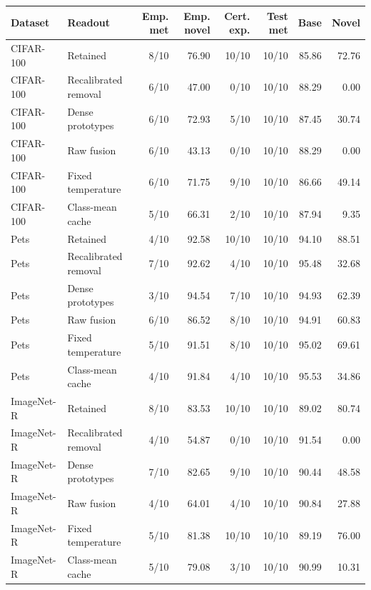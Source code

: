 \begin{tabular}{llrrrrrr}
\toprule
Dataset & Readout & Emp. met & Emp. novel & Cert. exp. & Test met & Base & Novel \\
\midrule
CIFAR-100 & Retained & 8/10 & 76.90 & 10/10 & 10/10 & 85.86 & 72.76 \\
CIFAR-100 & Recalibrated removal & 6/10 & 47.00 & 0/10 & 10/10 & 88.29 & 0.00 \\
CIFAR-100 & Dense prototypes & 6/10 & 72.93 & 5/10 & 10/10 & 87.45 & 30.74 \\
CIFAR-100 & Raw fusion & 6/10 & 43.13 & 0/10 & 10/10 & 88.29 & 0.00 \\
CIFAR-100 & Fixed temperature & 6/10 & 71.75 & 9/10 & 10/10 & 86.66 & 49.14 \\
CIFAR-100 & Class-mean cache & 5/10 & 66.31 & 2/10 & 10/10 & 87.94 & 9.35 \\
\midrule
Pets & Retained & 4/10 & 92.58 & 10/10 & 10/10 & 94.10 & 88.51 \\
Pets & Recalibrated removal & 7/10 & 92.62 & 4/10 & 10/10 & 95.48 & 32.68 \\
Pets & Dense prototypes & 3/10 & 94.54 & 7/10 & 10/10 & 94.93 & 62.39 \\
Pets & Raw fusion & 6/10 & 86.52 & 8/10 & 10/10 & 94.91 & 60.83 \\
Pets & Fixed temperature & 5/10 & 91.51 & 8/10 & 10/10 & 95.02 & 69.61 \\
Pets & Class-mean cache & 4/10 & 91.84 & 4/10 & 10/10 & 95.53 & 34.86 \\
\midrule
ImageNet-R & Retained & 8/10 & 83.53 & 10/10 & 10/10 & 89.02 & 80.74 \\
ImageNet-R & Recalibrated removal & 4/10 & 54.87 & 0/10 & 10/10 & 91.54 & 0.00 \\
ImageNet-R & Dense prototypes & 7/10 & 82.65 & 9/10 & 10/10 & 90.44 & 48.58 \\
ImageNet-R & Raw fusion & 4/10 & 64.01 & 4/10 & 10/10 & 90.84 & 27.88 \\
ImageNet-R & Fixed temperature & 5/10 & 81.38 & 10/10 & 10/10 & 89.19 & 76.00 \\
ImageNet-R & Class-mean cache & 5/10 & 79.08 & 3/10 & 10/10 & 90.99 & 10.31 \\
\bottomrule
\end{tabular}
